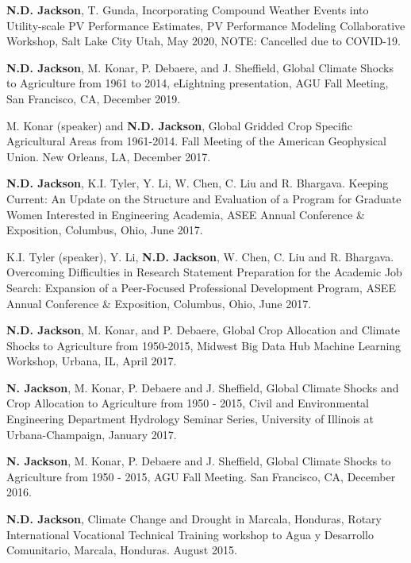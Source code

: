 \documentclass{article}[12pt]
\begin{document}
\begin{etaremune}[]
		\item \textbf{N.D. Jackson}, T. Gunda, Incorporating Compound Weather Events into Utility-scale PV Performance Estimates, PV Performance Modeling Collaborative Workshop, Salt Lake City Utah, May 2020,  NOTE: Cancelled due to COVID-19. 
		
		\item \textbf{N.D. Jackson}, M. Konar, P. Debaere, and J. Sheffield, Global Climate Shocks to Agriculture from 1961 to 2014, eLightning presentation, AGU Fall Meeting, San Francisco, CA, December 2019.  
		
		\item M. Konar (speaker) and \textbf{N.D. Jackson}, Global Gridded Crop Specific Agricultural Areas from 1961-2014. Fall Meeting of the American Geophysical Union. New Orleans, LA, December 2017.  
		
		\item \textbf{N.D. Jackson}, K.I. Tyler, Y. Li, W. Chen, C. Liu and R. Bhargava. Keeping Current: An Update on the Structure and Evaluation of a Program for Graduate Women Interested in Engineering Academia, ASEE Annual Conference \& Exposition, Columbus, Ohio, June 2017.
		
		\item K.I. Tyler (speaker), Y. Li, \textbf{N.D. Jackson}, W. Chen, C. Liu and R. Bhargava. Overcoming Difficulties in Research Statement Preparation for the Academic Job Search: Expansion of a Peer-Focused Professional Development Program, ASEE Annual Conference \& Exposition, Columbus, Ohio, June 2017.
		
		\item \textbf{N.D. Jackson}, M. Konar, and P. Debaere, Global Crop Allocation and Climate Shocks to Agriculture  from 1950-2015, Midwest Big Data Hub Machine Learning Workshop, Urbana, IL, April 2017.    
		
		\item \textbf{N. Jackson}, M. Konar, P. Debaere and J. Sheffield, Global Climate Shocks and Crop Allocation to Agriculture from 1950 - 2015, Civil and Environmental Engineering Department Hydrology Seminar Series, University of Illinois at Urbana-Champaign, January 2017.  
		
		\item \textbf{N. Jackson}, M. Konar, P. Debaere and J. Sheffield, Global Climate Shocks to Agriculture from 1950 - 2015, AGU Fall Meeting. San Francisco, CA, December 2016.
		
		\item \textbf{N.D. Jackson}, Climate Change and Drought in Marcala, Honduras, Rotary International Vocational Technical Training workshop to Agua y Desarrollo Comunitario, Marcala, Honduras. August 2015. 
		

\end{etaremune}
\end{document}
